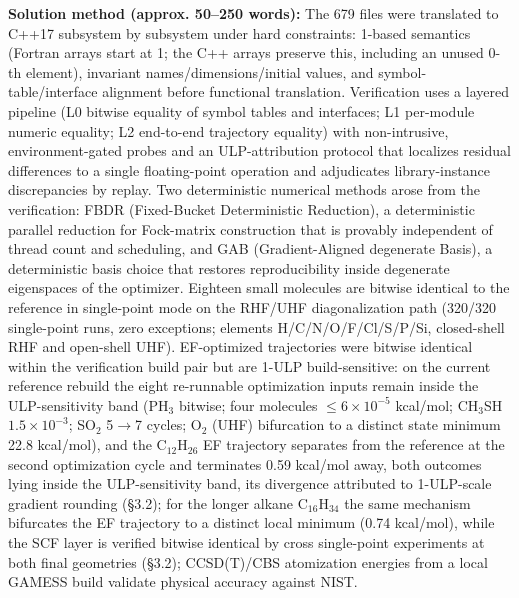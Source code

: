 \documentclass[preprint,12pt]{elsarticle}
\begin{document}
\textbf{Solution method (approx. 50--250 words):} The 679 files were translated to C++17 subsystem by subsystem under hard constraints: 1-based semantics (Fortran arrays start at 1; the C++ arrays preserve this, including an unused 0-th element), invariant names/dimensions/initial values, and symbol-table/interface alignment before functional translation. Verification uses a layered pipeline (L0 bitwise equality of symbol tables and interfaces; L1 per-module numeric equality; L2 end-to-end trajectory equality) with non-intrusive, environment-gated probes and an ULP-attribution protocol that localizes residual differences to a single floating-point operation and adjudicates library-instance discrepancies by replay. Two deterministic numerical methods arose from the verification: FBDR (Fixed-Bucket Deterministic Reduction), a deterministic parallel reduction for Fock-matrix construction that is provably independent of thread count and scheduling, and GAB (Gradient-Aligned degenerate Basis), a deterministic basis choice that restores reproducibility inside degenerate eigenspaces of the optimizer. Eighteen small molecules are bitwise identical to the reference in single-point mode on the RHF/UHF diagonalization path (320/320 single-point runs, zero exceptions; elements H/C/N/O/F/Cl/S/P/Si, closed-shell RHF and open-shell UHF). EF-optimized trajectories were bitwise identical within the verification build pair but are 1-ULP build-sensitive: on the current reference rebuild the eight re-runnable optimization inputs remain inside the ULP-sensitivity band (PH$_{3}$ bitwise; four molecules $\leq$$6\times 10^{-5}$ kcal/mol; CH$_{3}$SH $1.5\times 10^{-3}$; SO$_{2}$ 5$\rightarrow$7 cycles; O$_{2}$ (UHF) bifurcation to a distinct state minimum 22.8 kcal/mol), and the C$_{12}$H$_{26}$ EF trajectory separates from the reference at the second optimization cycle and terminates 0.59 kcal/mol away, both outcomes lying inside the ULP-sensitivity band, its divergence attributed to 1-ULP-scale gradient rounding (\S{}3.2); for the longer alkane C$_{16}$H$_{34}$ the same mechanism bifurcates the EF trajectory to a distinct local minimum (0.74 kcal/mol), while the SCF layer is verified bitwise identical by cross single-point experiments at both final geometries (\S{}3.2); CCSD(T)/CBS atomization energies from a local GAMESS build validate physical accuracy against NIST.
\end{document}
